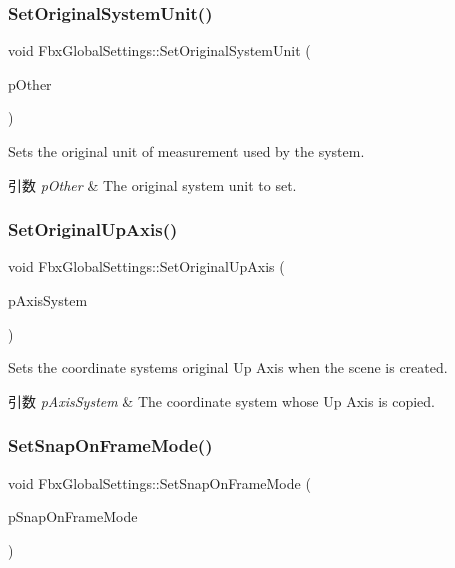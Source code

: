 \subsubsection{\texorpdfstring{Set\+Original\+System\+Unit()}{SetOriginalSystemUnit()}}
{\footnotesize\ttfamily void Fbx\+Global\+Settings\+::\+Set\+Original\+System\+Unit (\begin{DoxyParamCaption}\item[{const \hyperlink{class_fbx_system_unit}{Fbx\+System\+Unit} \&}]{p\+Other }\end{DoxyParamCaption})}

Sets the original unit of measurement used by the system. 
\begin{DoxyParams}{引数}
{\em p\+Other} & The original system unit to set. \\
\hline
\end{DoxyParams}
\mbox{\label{class_fbx_global_settings_af82679ae7c4df3249e547f6d18be9c19}} 
\subsubsection{\texorpdfstring{Set\+Original\+Up\+Axis()}{SetOriginalUpAxis()}}
{\footnotesize\ttfamily void Fbx\+Global\+Settings\+::\+Set\+Original\+Up\+Axis (\begin{DoxyParamCaption}\item[{const \hyperlink{class_fbx_axis_system}{Fbx\+Axis\+System} \&}]{p\+Axis\+System }\end{DoxyParamCaption})}

Sets the coordinate system\textquotesingle{}s original Up Axis when the scene is created. 
\begin{DoxyParams}{引数}
{\em p\+Axis\+System} & The coordinate system whose Up Axis is copied. \\
\hline
\end{DoxyParams}
\mbox{\label{class_fbx_global_settings_a4437203e7bfa3463d234154c9e3dc0c2}} 
\subsubsection{\texorpdfstring{Set\+Snap\+On\+Frame\+Mode()}{SetSnapOnFrameMode()}}
{\footnotesize\ttfamily void Fbx\+Global\+Settings\+::\+Set\+Snap\+On\+Frame\+Mode (\begin{DoxyParamCaption}\item[{\hyperlink{class_fbx_global_settings_ada0423e32bb00b73cb43b94d54c54b4a}{E\+Snap\+On\+Frame\+Mode}}]{p\+Snap\+On\+Frame\+Mode }\end{DoxyParamCaption})}

